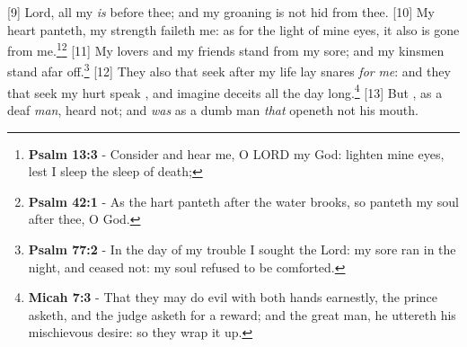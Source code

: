 [9] \textcolor[cmyk]{0.99998,1,0,0}{Lord, all my  \emph{is} before thee; and my groaning is not hid from thee.}
[10] \textcolor[cmyk]{0.99998,1,0,0}{My heart panteth, my strength faileth me: as for the light of mine eyes, it also is gone from me.}\footnote{\textbf{Psalm 13:3} - Consider and hear me, O LORD my God: lighten mine eyes, lest I sleep the sleep of death;}\footnote{\textbf{Psalm 42:1} - As the hart panteth after the water brooks, so panteth my soul after thee, O God.}
[11] \textcolor[cmyk]{0.99998,1,0,0}{My lovers and my friends stand  from my sore; and my kinsmen stand afar off.}\footnote{\textbf{Psalm 77:2} - In the day of my trouble I sought the Lord: my sore ran in the night, and ceased not: my soul refused to be comforted.}
[12] \textcolor[cmyk]{0.99998,1,0,0}{They also that seek after my life lay snares \emph{for} \emph{me}: and they that seek my hurt speak , and imagine deceits all the day long.}\footnote{\textbf{Micah 7:3} - That they may do evil with both hands earnestly, the prince asketh, and the judge asketh for a reward; and the great man, he uttereth his mischievous desire: so they wrap it up.}
[13] \textcolor[cmyk]{0.99998,1,0,0}{But , as a deaf \emph{man}, heard not; and \emph{} \emph{was} as a dumb man \emph{that} openeth not his mouth.}
